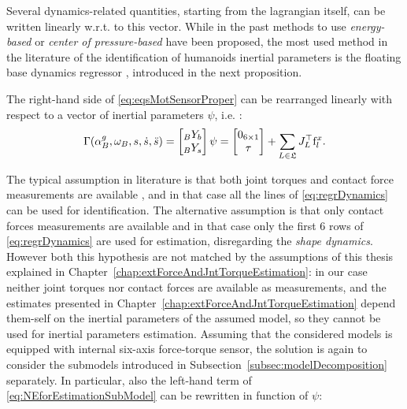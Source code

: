 Several dynamics-related quantities, starting from the lagrangian itself, can be written linearly w.r.t. to this vector. While in the past methods to use \emph{energy-based} \citep{gautier1988energy,gautier1997power} or \emph{center of pressure-based} \citep{baelemans2013,baelemans2013thesis} have been proposed, the most used method in the literature of the identification of humanoids inertial parameters is the floating base dynamics regressor \citep{jovic2015,ayusawa2013,ogawa2014,Mistry2009}, introduced in the next proposition. 

\begin{proposition}
The right-hand side of \eqref{eq:eqsMotSensorProper} can be rearranged linearly with respect to a vector of inertial parameters $\psi$, i.e. : 
\begin{eqnarray}
\label{eq:regrDynamics}
\Gamma(\alpha^g_B,\omega_{B},s,\dot{s},\ddot{s}) =
\begin{bmatrix}
\hspace{0em}_{B}{Y}_{b} \\
\hspace{0em}_{B}{Y}_{s} 
\end{bmatrix}
\psi =
\begin{bmatrix}
0_{6 \times 1} \\
\tau 
\end{bmatrix}
+
\sum_{L \in \mathfrak{L}} J_L^\top {\rm f}_l^{x}.
\end{eqnarray}
\end{proposition}

The typical assumption in literature is that both joint torques and contact force measurements are available \citep{Mistry2009,ogawa2014}, and in that case all the lines of \eqref{eq:regrDynamics} can be used for identification. The alternative assumption is that only contact forces measurements are available \citep{ayusawa2013,jovic2015} and in that case only the first 6 rows of \eqref{eq:regrDynamics} are used for estimation, disregarding the \emph{shape dynamics}. 
However both this hypothesis are not matched by the assumptions of this thesis explained in Chapter~\ref{chap:extForceAndJntTorqueEstimation}: in our case neither joint torques nor contact forces are available as measurements, and the estimates presented in  Chapter~\ref{chap:extForceAndJntTorqueEstimation} depend them-self on the inertial parameters of the assumed model, so they cannot be used for inertial parameters estimation. Assuming that the considered models is equipped with internal six-axis force-torque sensor, the solution is again to consider the submodels introduced in Subsection~\ref{subsec:modelDecomposition} separately. In particular, also the left-hand term of \eqref{eq:NEforEstimationSubModel} can be rewritten in function of $\psi$:


